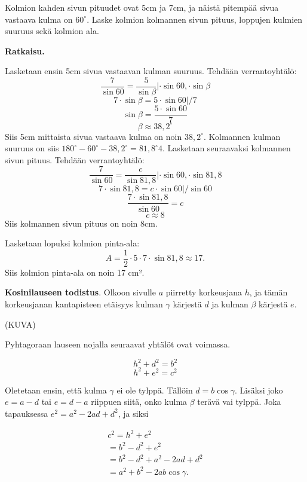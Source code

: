 \begin{esimerkki}
Kolmion kahden sivun pituudet ovat 5cm ja 7cm, ja näistä pitempää sivua vastaava kulma on $60^\circ$. Laske kolmion kolmannen sivun pituus, loppujen kulmien suuruus sekä kolmion ala.

\textbf{Ratkaisu.}

Lasketaan ensin 5cm sivua vastaavan kulman suuruus. Tehdään verrantoyhtälö:
$$\frac{7}{\sin 60} = \frac{5}{\sin \beta} | \cdot \sin 60, \cdot \sin \beta$$
$$7 \cdot \sin \beta = 5 \cdot \sin 60 | / 7$$
$$\sin \beta = \frac{5 \cdot \sin 60}{7}$$
$$\beta \approx 38,2^\circ$$
Siis 5cm mittaista sivua vastaava kulma on noin $38,2^\circ$. Kolmannen kulman suuruus on siis $180^\circ - 60^\circ -38,2^\circ = 81,8^\circ4$.
Lasketaan seuraavaksi kolmannen sivun pituus. Tehdään verrantoyhtälö:
$$\frac{7}{\sin 60} = \frac{c}{\sin 81,8}| \cdot \sin 60, \cdot \sin 81,8$$
$$7 \cdot \sin 81,8 = c \cdot \sin 60 | / \sin 60$$
$$\frac{7 \cdot \sin 81,8}{\sin 60} = c$$
$$c \approx 8$$
Siis kolmannen sivun pituus on noin 8cm.

Lasketaan lopuksi kolmion pinta-ala:
$$A = \frac{1}{2} \cdot 5 \cdot 7 \cdot \sin 81,8 \approx 17.$$
Siis kolmion pinta-ala on noin 17 cm².
\end{esimerkki}


\textbf{Kosinilauseen todistus}. Olkoon sivulle $a$ piirretty korkeusjana $h$, ja tämän
korkeusjanan kantapisteen etäisyys kulman $\gamma$ kärjestä $d$ ja kulman $\beta$ kärjestä $e$.

(KUVA)

Pyhtagoraan lauseen nojalla seuraavat yhtälöt ovat voimassa.

\[
h^2 + d^2 = b^2
\]
\[
h^2 + e^2 = c^2
\]

Oletetaan ensin, että kulma $\gamma$ ei ole tylppä. Tällöin $d = b \cos \gamma$.
Lisäksi joko $e = a - d$ tai $e = d - a$ riippuen siitä, onko kulma $\beta$ terävä vai
tylppä. Joka tapauksessa $e^2 = a^2 - 2ad + d^2$, ja siksi

\begin{align*}
c^2 = h^2 + e^2 \\
= b^2 - d^2 + e^2 \\
= b^2 - d^2 + a^2 - 2 a d + d^2 \\
= a^2 + b^2 - 2 a b \cos \gamma .
\end{align*}

